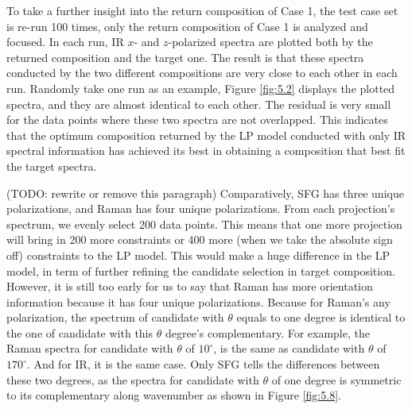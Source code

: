 To take a further insight into the return composition of Case 1, the test case set is re-run 100 times, only the return composition of Case 1 is analyzed and focused. In each run, IR $x$- and $z$-polarized spectra are plotted both by the returned composition and the target one. The result is that these spectra conducted by the two different compositions are very close to each other in each run. Randomly take one run as an example, Figure \ref{fig:5.2} displays the plotted spectra, and they are almost identical to each other. The residual is very small for the data points where these two spectra are not overlapped. This indicates that the optimum composition returned by the LP model conducted with only IR spectral information has achieved its best in obtaining a composition that best fit the target spectra. 

(TODO: rewrite or remove this paragraph) Comparatively, SFG has three unique polarizations, and Raman has four unique polarizations. From each projection's spectrum, we evenly select 200 data points. This means that one more projection will bring in 200 more constraints or 400 more (when we take the absolute sign off) constraints to the LP model. This would make a huge difference in the LP model, in term of further refining the candidate selection in target composition. However, it is still too early for us to say that Raman has more orientation information because it has four unique polarizations. Because for Raman's any polarization, the spectrum of candidate with $\theta$ equals to one degree is identical to the one of candidate with this $\theta$ degree's complementary. For example, the Raman spectra for candidate with $\theta$ of $10^{\circ}$, is the same as candidate with $\theta$ of $170^{\circ}$. And for IR, it is the same case. Only SFG tells the differences between these two degrees, as the spectra for candidate with $\theta$ of one degree is symmetric to its complementary along wavenumber as shown in Figure \ref{fig:5.8}. \\

